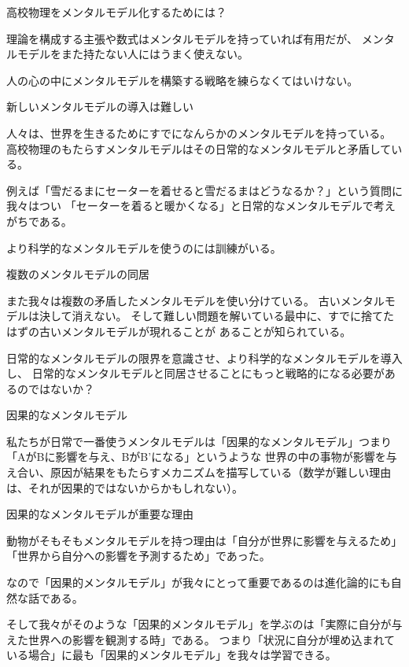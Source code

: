 \documentclass[12pt, unicode]{beamer}
\begin{document}
\begin{frame}{高校物理をメンタルモデル化するためには？}

理論を構成する主張や数式はメンタルモデルを持っていれば有用だが、
メンタルモデルをまた持たない人にはうまく使えない。

人の心の中にメンタルモデルを構築する戦略を練らなくてはいけない。

\end{frame}

\begin{frame}{新しいメンタルモデルの導入は難しい}

人々は、世界を生きるためにすでになんらかのメンタルモデルを持っている。
高校物理のもたらすメンタルモデルはその日常的なメンタルモデルと矛盾している。

例えば「雪だるまにセーターを着せると雪だるまはどうなるか？」という質問に我々はつい
「セーターを着ると暖かくなる」と日常的なメンタルモデルで考えがちである。

より科学的なメンタルモデルを使うのには訓練がいる。

\end{frame}

\begin{frame}{複数のメンタルモデルの同居}

また我々は複数の矛盾したメンタルモデルを使い分けている。
古いメンタルモデルは決して消えない。
そして難しい問題を解いている最中に、すでに捨てたはずの古いメンタルモデルが現れることが
あることが知られている。

日常的なメンタルモデルの限界を意識させ、より科学的なメンタルモデルを導入し、
日常的なメンタルモデルと同居させることにもっと戦略的になる必要があるのではないか？

\end{frame}

\begin{frame}{因果的なメンタルモデル}

私たちが日常で一番使うメンタルモデルは「因果的なメンタルモデル」つまり「AがBに影響を与え、BがB'になる」というような
世界の中の事物が影響を与え合い、原因が結果をもたらすメカニズムを描写している（数学が難しい理由は、それが因果的ではないからかもしれない）。

\end{frame}

\begin{frame}{因果的なメンタルモデルが重要な理由}

動物がそもそもメンタルモデルを持つ理由は「自分が世界に影響を与えるため」「世界から自分への影響を予測するため」であった。

なので「因果的メンタルモデル」が我々にとって重要であるのは進化論的にも自然な話である。

そして我々がそのような「因果的メンタルモデル」を学ぶのは「実際に自分が与えた世界への影響を観測する時」である。
つまり「状況に自分が埋め込まれている場合」に最も「因果的メンタルモデル」を我々は学習できる。

\end{frame}
\end{document}
